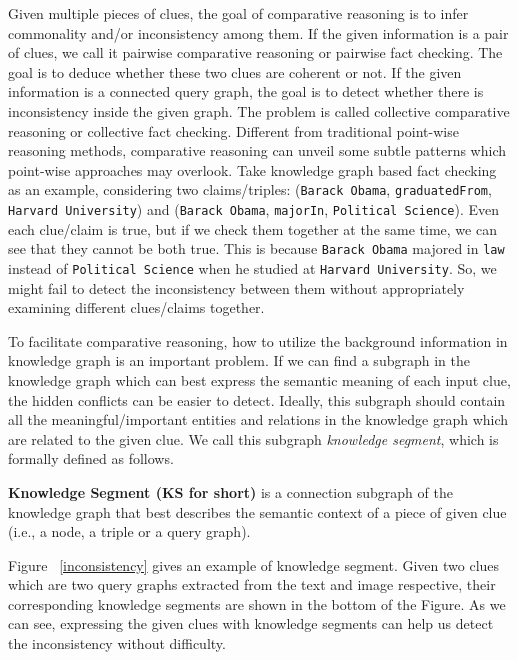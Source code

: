 Given multiple pieces of clues, the goal of comparative reasoning is to infer commonality and/or inconsistency among them.  
If the given information is a pair of clues, we call it pairwise comparative reasoning or pairwise fact checking. The goal is to deduce whether these two clues are coherent or not. 
If the given information is a connected query graph, the goal is to detect whether there is inconsistency inside the given graph. The problem is called collective comparative reasoning or collective fact checking.
Different from traditional point-wise reasoning methods, comparative reasoning can unveil some subtle patterns which point-wise approaches may overlook.
Take knowledge graph based fact checking as an example, considering two claims/triples: 
({\tt Barack Obama}, {\tt graduatedFrom}, {\tt Harvard University}) and
({\tt Barack Obama}, {\tt majorIn}, {\tt Political Science}).
Even each clue/claim is true,  but if we check them together at the same time, we can see that they cannot be both true. This is because {\tt Barack Obama} majored in {\tt law} instead of {\tt Political Science} when he studied at {\tt Harvard University}. So, we might fail to detect the inconsistency between them without appropriately examining different clues/claims together.

To facilitate comparative reasoning, how to utilize the background information in knowledge graph is an important problem.
If we can find a subgraph in the knowledge graph which can best express the semantic meaning of each input clue, the hidden conflicts can be easier to detect. Ideally, this subgraph should contain all the meaningful/important entities and relations in the knowledge graph which 
are related to the given clue.
We call this subgraph {\em knowledge segment}, 
which is formally defined as follows.
\begin{definition}{\textbf{Knowledge Segment (KS for short)}} is a connection subgraph of the knowledge graph that best describes the semantic context of a piece of given clue (i.e., a node, a triple or a query graph).\vspace{-0.5\baselineskip}
\end{definition}

Figure ~\ref{inconsistency} gives an example of { knowledge segment}. Given two clues which are two query graphs extracted from the text and image respective, their corresponding knowledge segments are shown in the bottom of the Figure. As we can see, expressing the given clues with { knowledge segments} can help us detect the inconsistency without difficulty. 


